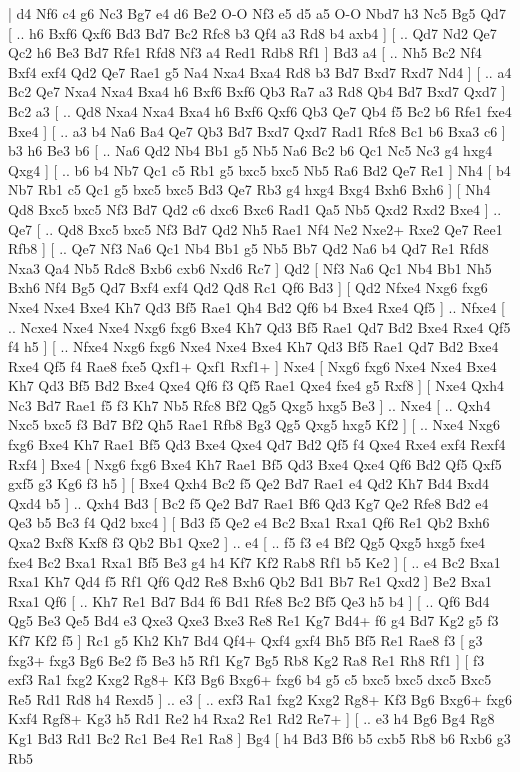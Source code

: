 \makegametitle 
|   d4   Nf6    c4   g6    Nc3   Bg7    e4   d6    Be2   O-O    Nf3   e5    d5   a5    O-O   Nbd7    h3   Nc5    Bg5   Qd7 [ .. h6  Bxf6 Qxf6  Bd3 Bd7  Bc2 Rfc8  b3 Qf4  a3 Rd8  b4 axb4   ]  [ .. Qd7  Nd2 Qe7  Qc2 h6  Be3 Bd7  Rfe1 Rfd8  Nf3 a4  Red1 Rdb8  Rf1   ]  Bd3   a4 [ .. Nh5  Bc2 Nf4  Bxf4 exf4  Qd2 Qe7  Rae1 g5  Na4 Nxa4  Bxa4 Rd8  b3 Bd7  Bxd7 Rxd7  Nd4   ]  [ .. a4  Bc2 Qe7  Nxa4 Nxa4  Bxa4 h6  Bxf6 Bxf6  Qb3 Ra7  a3 Rd8  Qb4 Bd7  Bxd7 Qxd7   ]  Bc2   a3 [ .. Qd8  Nxa4 Nxa4  Bxa4 h6  Bxf6 Qxf6  Qb3 Qe7  Qb4 f5  Bc2 b6  Rfe1 fxe4  Bxe4   ]  [ .. a3  b4 Na6  Ba4 Qe7  Qb3 Bd7  Bxd7 Qxd7  Rad1 Rfc8  Bc1 b6  Bxa3 c6   ]  b3   h6    Be3   b6 [ .. Na6  Qd2 Nb4  Bb1 g5  Nb5 Na6  Bc2 b6  Qc1 Nc5  Nc3 g4  hxg4 Qxg4   ]  [ .. b6  b4 Nb7  Qc1 c5  Rb1 g5  bxc5 bxc5  Nb5 Ra6  Bd2 Qe7  Re1   ]  Nh4 [  b4 Nb7  Rb1 c5  Qc1 g5  bxc5 bxc5  Bd3 Qe7  Rb3 g4  hxg4 Bxg4  Bxh6 Bxh6   ]  [  Nh4 Qd8  Bxc5 bxc5  Nf3 Bd7  Qd2 c6  dxc6 Bxc6  Rad1 Qa5  Nb5 Qxd2  Rxd2 Bxe4   ] .. Qe7 [ .. Qd8  Bxc5 bxc5  Nf3 Bd7  Qd2 Nh5  Rae1 Nf4  Ne2 Nxe2+  Rxe2 Qe7  Ree1 Rfb8   ]  [ .. Qe7  Nf3 Na6  Qc1 Nb4  Bb1 g5  Nb5 Bb7  Qd2 Na6  b4 Qd7  Re1 Rfd8  Nxa3 Qa4  Nb5 Rdc8  Bxb6 cxb6  Nxd6 Rc7   ]  Qd2 [  Nf3 Na6  Qc1 Nb4  Bb1 Nh5  Bxh6 Nf4  Bg5 Qd7  Bxf4 exf4  Qd2 Qd8  Rc1 Qf6  Bd3   ]  [  Qd2 Nfxe4  Nxg6 fxg6  Nxe4 Nxe4  Bxe4 Kh7  Qd3 Bf5  Rae1 Qh4  Bd2 Qf6  b4 Bxe4  Rxe4 Qf5   ] .. Nfxe4    [ .. Ncxe4  Nxe4 Nxe4  Nxg6 fxg6  Bxe4 Kh7  Qd3 Bf5  Rae1 Qd7  Bd2 Bxe4  Rxe4 Qf5  f4 h5   ]  [ .. Nfxe4  Nxg6 fxg6  Nxe4 Nxe4  Bxe4 Kh7  Qd3 Bf5  Rae1 Qd7  Bd2 Bxe4  Rxe4 Qf5  f4 Rae8  fxe5 Qxf1+  Qxf1 Rxf1+   ]  Nxe4 [  Nxg6 fxg6  Nxe4 Nxe4  Bxe4 Kh7  Qd3 Bf5  Bd2 Bxe4  Qxe4 Qf6  f3 Qf5  Rae1 Qxe4  fxe4 g5  Rxf8   ]  [  Nxe4 Qxh4  Nc3 Bd7  Rae1 f5  f3 Kh7  Nb5 Rfc8  Bf2 Qg5  Qxg5 hxg5  Be3   ] .. Nxe4 [ .. Qxh4  Nxc5 bxc5  f3 Bd7  Bf2 Qh5  Rae1 Rfb8  Bg3 Qg5  Qxg5 hxg5  Kf2   ]  [ .. Nxe4  Nxg6 fxg6  Bxe4 Kh7  Rae1 Bf5  Qd3 Bxe4  Qxe4 Qd7  Bd2 Qf5  f4 Qxe4  Rxe4 exf4  Rexf4 Rxf4   ]  Bxe4 [  Nxg6 fxg6  Bxe4 Kh7  Rae1 Bf5  Qd3 Bxe4  Qxe4 Qf6  Bd2 Qf5  Qxf5 gxf5  g3 Kg6  f3 h5   ]  [  Bxe4 Qxh4  Bc2 f5  Qe2 Bd7  Rae1 e4  Qd2 Kh7  Bd4 Bxd4  Qxd4 b5   ] .. Qxh4    Bd3 [  Bc2 f5  Qe2 Bd7  Rae1 Bf6  Qd3 Kg7  Qe2 Rfe8  Bd2 e4  Qe3 b5  Bc3 f4  Qd2 bxc4   ]  [  Bd3 f5  Qe2 e4  Bc2 Bxa1  Rxa1 Qf6  Re1 Qb2  Bxh6 Qxa2  Bxf8 Kxf8  f3 Qb2  Bb1 Qxe2   ] .. e4 [ .. f5  f3 e4  Bf2 Qg5  Qxg5 hxg5  fxe4 fxe4  Bc2 Bxa1  Rxa1 Bf5  Be3 g4  h4 Kf7  Kf2 Rab8  Rf1 b5  Ke2   ]  [ .. e4  Bc2 Bxa1  Rxa1 Kh7  Qd4 f5  Rf1 Qf6  Qd2 Re8  Bxh6 Qb2  Bd1 Bb7  Re1 Qxd2   ]  Be2   Bxa1    Rxa1   Qf6 [ .. Kh7  Re1 Bd7  Bd4 f6  Bd1 Rfe8  Bc2 Bf5  Qe3 h5  b4   ]  [ .. Qf6  Bd4 Qg5  Be3 Qe5  Bd4 e3  Qxe3 Qxe3  Bxe3 Re8  Re1 Kg7  Bd4+ f6  g4 Bd7  Kg2 g5  f3 Kf7  Kf2 f5   ]  Rc1   g5    Kh2   Kh7    Bd4   Qf4+    Qxf4   gxf4    Bh5   Bf5    Re1   Rae8    f3 [  g3 fxg3+  fxg3 Bg6  Be2 f5  Be3 h5  Rf1 Kg7  Bg5 Rb8  Kg2 Ra8  Re1 Rh8  Rf1   ]  [  f3 exf3  Ra1 fxg2  Kxg2 Rg8+  Kf3 Bg6  Bxg6+ fxg6  b4 g5  c5 bxc5  bxc5 dxc5  Bxc5 Re5  Rd1 Rd8  h4 Rexd5   ] .. e3 [ .. exf3  Ra1 fxg2  Kxg2 Rg8+  Kf3 Bg6  Bxg6+ fxg6  Kxf4 Rgf8+  Kg3 h5  Rd1 Re2  h4 Rxa2  Re1 Rd2  Re7+   ]  [ .. e3  h4 Bg6  Bg4 Rg8  Kg1 Bd3  Rd1 Bc2  Rc1 Be4  Re1 Ra8   ]  Bg4 [  h4 Bd3  Bf6 b5  cxb5 Rb8  b6 Rxb6  g3 Rb5  